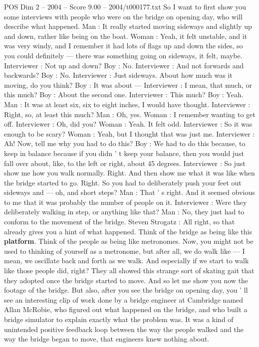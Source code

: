 \begin{textsample}{POS Dim 2 – 2004 – Score 9.00 – 2004/t000177.txt}
So I want to first show you some interviews with people who were on the bridge on opening day, who will describe what happened.
Man : It really started moving sideways and slightly up and down, rather like being on the boat.
Woman : Yeah, it felt unstable, and it was very windy, and I remember it had lots of flags up and down the sides, so you could definitely — there was something going on sideways, it felt, maybe.
Interviewer : Not up and down?
Boy : No.
Interviewer : And not forwards and backwards?
Boy : No.
Interviewer : Just sideways.
About how much was it moving, do you think?
Boy : It was about — Interviewer : I mean, that much, or this much?
Boy : About the second one.
Interviewer : This much?
Boy : Yeah.
Man : It was at least six, six to eight inches, I would have thought.
Interviewer : Right, so, at least this much?
Man : Oh, yes.
Woman : I remember wanting to get off.
Interviewer : Oh, did you?
Woman : Yeah.
It felt odd.
Interviewer : So it was enough to be scary?
Woman : Yeah, but I thought that was just me.
Interviewer : Ah!
Now, tell me why you had to do this?
Boy : We had to do this because, to keep in balance because if you didn ' t keep your balance, then you would just fall over about, like, to the left or right, about 45 degrees.
Interviewer : So just show me how you walk normally.
Right.
And then show me what it was like when the bridge started to go.
Right.
So you had to deliberately push your feet out sideways and — oh, and short steps?
Man : That ' s right.
And it seemed obvious to me that it was probably the number of people on it.
Interviewer : Were they deliberately walking in step, or anything like that?
Man : No, they just had to conform to the movement of the bridge.
Steven Strogatz : All right, so that already gives you a hint of what happened.
Think of the bridge as being like this \textbf{platform}.
Think of the people as being like metronomes.
Now, you might not be used to thinking of yourself as a metronome, but after all, we do walk like — I mean, we oscillate back and forth as we walk.
And especially if we start to walk like those people did, right?
They all showed this strange sort of skating gait that they adopted once the bridge started to move.
And so let me show you now the footage of the bridge.
But also, after you see the bridge on opening day, you ' ll see an interesting clip of work done by a bridge engineer at Cambridge named Allan McRobie, who figured out what happened on the bridge, and who built a bridge simulator to explain exactly what the problem was.
It was a kind of unintended positive feedback loop between the way the people walked and the way the bridge began to move, that engineers knew nothing about.

\end{textsample}
